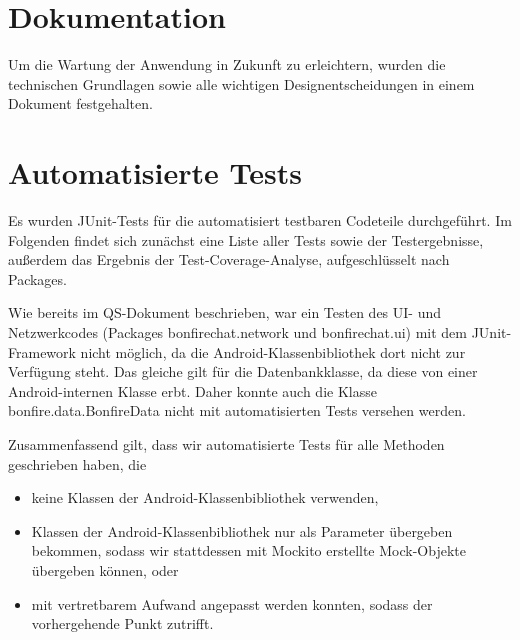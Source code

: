 




\clearpage
\section{Dokumentation}

Um die Wartung der Anwendung in Zukunft zu erleichtern, wurden die technischen Grundlagen
sowie alle wichtigen Designentscheidungen in einem Dokument festgehalten.






\clearpage
\section{Automatisierte Tests}

Es wurden JUnit-Tests für die automatisiert testbaren Codeteile durchgeführt.
Im Folgenden findet sich zunächst eine Liste aller Tests sowie der Testergebnisse,
außerdem das Ergebnis der Test-Coverage-Analyse, aufgeschlüsselt nach Packages.

Wie bereits im QS-Dokument beschrieben, war ein Testen des UI- und Netzwerkcodes
(Packages bonfirechat.network und bonfirechat.ui)
mit dem JUnit-Framework nicht möglich, da die Android-Klassenbibliothek dort nicht
zur Verfügung steht. Das gleiche gilt für die Datenbankklasse, da diese von einer
Android-internen Klasse erbt. Daher konnte auch die Klasse bonfire.data.BonfireData
nicht mit automatisierten Tests versehen werden.

Zusammenfassend gilt, dass wir automatisierte Tests für alle Methoden geschrieben haben,
die
\begin{itemize}
\item keine Klassen der Android-Klassenbibliothek verwenden,
\item Klassen der Android-Klassenbibliothek nur als Parameter übergeben bekommen,
sodass wir stattdessen mit Mockito erstellte Mock-Objekte übergeben können, oder
\item mit vertretbarem Aufwand angepasst werden konnten, sodass der vorhergehende Punkt zutrifft.
\end{itemize}


